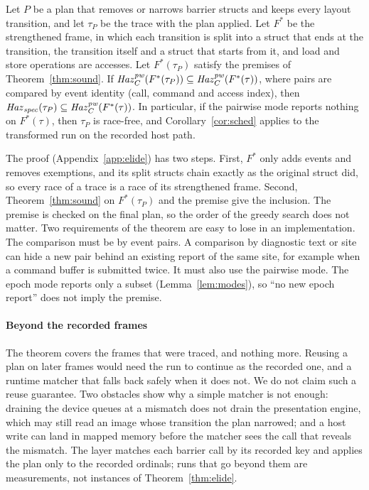 \begin{theorem}\label{thm:elide}
Let $P$ be a plan that removes or narrows barrier structs and keeps every layout transition, and let $\tau_P$ be the
trace with the plan applied. Let $F^*$ be the strengthened frame, in which each transition is split into a struct that
ends at the transition, the transition itself and a struct that starts from it, and load and store operations are
accesses. Let $F^*(\tau_P)$ satisfy the premises of Theorem~\ref{thm:sound}. If
$\mathit{Haz}_C^{\mathit{pw}}(F^*(\tau_P)) \subseteq \mathit{Haz}_C^{\mathit{pw}}(F^*(\tau))$, where pairs are compared by event identity (call, command and access
index), then $\mathit{Haz}_{\mathit{spec}}(\tau_P) \subseteq \mathit{Haz}_C^{\mathit{pw}}(F^*(\tau))$. In particular, if the pairwise mode reports nothing on
$F^*(\tau)$, then $\tau_P$ is race-free, and Corollary~\ref{cor:sched} applies to the transformed run on the recorded
host path.
\end{theorem}

The proof (Appendix~\ref{app:elide}) has two steps. First, $F^*$ only adds events and removes exemptions, and its
split structs chain exactly as the original struct did, so every race of a trace is a race of its strengthened frame.
Second, Theorem~\ref{thm:sound} on $F^*(\tau_P)$ and the premise give the inclusion. The premise is checked on the final
plan, so the order of the greedy search does not matter. Two requirements of the theorem are easy to lose in an
implementation. The comparison must be by event pairs. A comparison by diagnostic text or site can hide a new pair
behind an existing report of the same site, for example when a command buffer is submitted twice. It must also use the
pairwise mode. The epoch mode reports only a subset (Lemma~\ref{lem:modes}), so ``no new epoch report'' does not
imply the premise.

\paragraph{Beyond the recorded frames}
The theorem covers the frames that were traced, and nothing more. Reusing a plan on later frames would need the run to
continue as the recorded one, and a runtime matcher that falls back safely when it does not. We do not claim such a
reuse guarantee. Two obstacles show why a simple matcher is not enough: draining the device queues at a mismatch does
not drain the presentation engine, which may still read an image whose transition the plan narrowed; and a host write
can land in mapped memory before the matcher sees the call that reveals the mismatch. The layer
 matches each barrier call by its recorded key and applies the plan only to the
recorded ordinals; runs that go beyond them are measurements, not instances of Theorem~\ref{thm:elide}.

